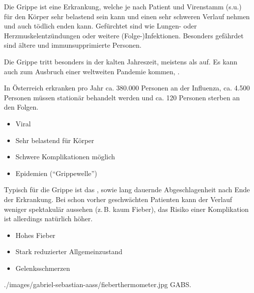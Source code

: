 {%
Die Grippe ist eine  Erkrankung, welche je nach
Patient und Virenstamm (s.u.) für den Körper sehr belastend
sein kann und einen sehr schweren Verlauf nehmen und auch
tödlich enden kann. Gefürchtet sind  wie
Lungen- oder Herzmuskelentzündungen oder weitere
(Folge-)Infektionen. Besonders gefährdet sind ältere und
immunsupprimierte Personen.


Die Grippe tritt besonders in der kalten Jahreszeit,
meistens als  auf. Es kann auch
zum Ausbruch einer weltweiten Pandemie
kommen, .

In Österreich erkranken pro Jahr ca. 380.000 Personen an der
Influenza, ca. 4.500 Personen müssen stationär behandelt werden und
ca. 120 Personen sterben an den
Folgen\cite{Strauss0000}.


}{
\begin{itemize}
  \item Viral
  \item Sehr belastend für Körper
  \item Schwere Komplikationen möglich
  \item Epidemien (\enquote{Grippewelle})
\end{itemize}
}{}{}{}




{%
Typisch für die Grippe ist das , sowie lang dauernde
Abgeschlagenheit nach Ende der Erkrankung. Bei schon vorher
geschwächten Patienten kann der Verlauf weniger spektakulär
aussehen (z.\,B. kaum Fieber), das Risiko einer
Komplikation ist allerdings natürlich höher.
}
{
\begin{itemize}
  \item Hohes Fieber
  \item Stark reduzierter Allgemeinzustand
  \item Gelenksschmerzen
\end{itemize}
}
{./images/gabriel-sebastian-aass/fieberthermometer.jpg}
{}
{GABS.}



